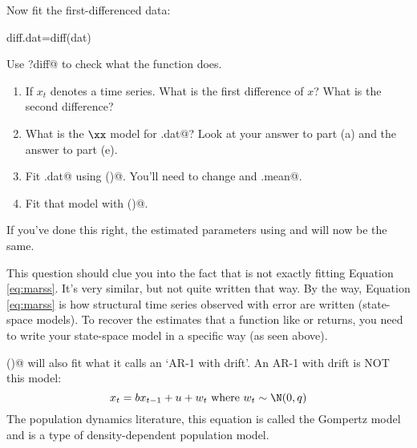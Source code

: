 \begin{hwenumerate}
Now fit the first-differenced data:

\begin{Schunk}
\begin{Sinput}
 diff.dat=diff(dat)
\end{Sinput}
\end{Schunk}

Use \verb@?diff@ to check what the \verb@diff@ function does.

\begin{enumerate}[resume]
\item If $x_t$ denotes a time series.  What is the first difference of $x$?  What is the second difference?
\item What is the $\xx$ model for \verb@diff.dat@?  Look at your answer to part (a) and the answer to part (e).
\item Fit \verb@diff.dat@ using \verb@Arima()@. You'll need to change \verb@order@ and \verb@include.mean@.
\item Fit that model with \verb@MARSS()@.
\end{enumerate}
If you've done this right, the estimated parameters using \verb@Arima@ and \verb@MARSS@ will now be the same.

This question should clue you into the fact that \verb@Arima@ is not exactly fitting Equation \ref{eq:marss}.  It's very similar, but not quite written that way.  By the way, Equation \ref{eq:marss} is how structural time series observed with error are written (state-space models). To recover the estimates that a function like \verb@arima@ or \verb@Arima@ returns,  you need to write your state-space model in a specific way (as seen above).

\item\label{hw-uniss-3}  \verb@Arima()@ will also fit what it calls an `AR-1 with drift'.  An AR-1 with drift is NOT this model: 
\begin{equation}
x_t = b x_{t-1}+u+w_t \text{ where } w_t \sim \N(0,q)  
\label{eq:gompertz}\end{equation}
The population dynamics literature, this equation is called the Gompertz model and is a type of density-dependent population model.


\end{hwenumerate}
